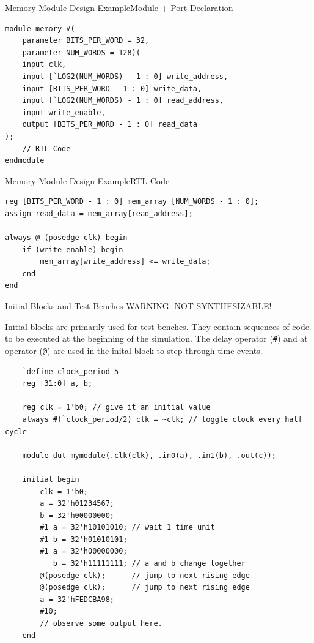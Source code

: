 \documentclass{beamer}
\begin{document}
\begin{frame}[fragile]{Memory Module Design Example}{Module + Port Declaration}
\begin{verbatim}
module memory #(
	parameter BITS_PER_WORD = 32, 
	parameter NUM_WORDS = 128)(
	input clk,
	input [`LOG2(NUM_WORDS) - 1 : 0] write_address,
	input [BITS_PER_WORD - 1 : 0] write_data,
	input [`LOG2(NUM_WORDS) - 1 : 0] read_address,
	input write_enable,
	output [BITS_PER_WORD - 1 : 0] read_data
);
	// RTL Code
endmodule
\end{verbatim}
\end{frame}

\begin{frame}[fragile]{Memory Module Design Example}{RTL Code}
\begin{verbatim}
reg [BITS_PER_WORD - 1 : 0] mem_array [NUM_WORDS - 1 : 0];
assign read_data = mem_array[read_address];

always @ (posedge clk) begin
	if (write_enable) begin
		mem_array[write_address] <= write_data;
	end
end
\end{verbatim}
\end{frame}

\begin{frame}[fragile]{Initial Blocks and Test Benches}
	WARNING: NOT SYNTHESIZABLE!

	Initial blocks are primarily used for test benches.
	They contain sequences of code to be executed at the beginning of the simulation.
	The delay operator (\texttt{\#}) and at operator (\texttt{@}) are used in the inital block to step through time events.

	\begin{verbatim}
	`define clock_period 5
	reg [31:0] a, b;

	reg clk = 1'b0; // give it an initial value
	always #(`clock_period/2) clk = ~clk; // toggle clock every half cycle

	module dut mymodule(.clk(clk), .in0(a), .in1(b), .out(c));

	initial begin
		clk = 1'b0;
		a = 32'h01234567;
		b = 32'h00000000;
		#1 a = 32'h10101010; // wait 1 time unit
		#1 b = 32'h01010101;
		#1 a = 32'h00000000;
		   b = 32'h11111111; // a and b change together
		@(posedge clk);      // jump to next rising edge
		@(posedge clk);      // jump to next rising edge
		a = 32'hFEDCBA98;
		#10;
		// observe some output here.
	end
	\end{verbatim}

\end{frame}
\end{document}
